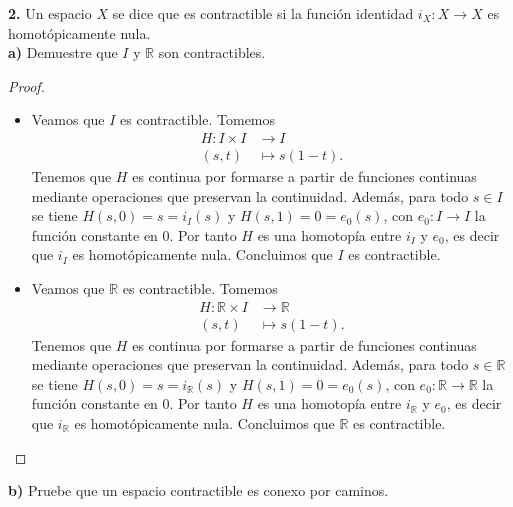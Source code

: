 \textbf{2.} Un espacio $X$ se dice que es contractible si la función identidad $i_X:X\to X$ es homotópicamente nula.\\
\textbf{a)} Demuestre que $I$ y $\mathbb{R}$ son contractibles.
\begin{proof}
   \phantom{o}
   \begin{itemize}
      \item Veamos que $I$ es contractible. Tomemos
         \[
         \begin{aligned}
         H \colon I \times I &\longrightarrow I \\
         (s,t) &\longmapsto s(1-t).
         \end{aligned}
         \]
         Tenemos que $H$ es continua por formarse a partir de funciones continuas mediante operaciones que preservan la continuidad. Además, para todo $s\in I$ se tiene $H(s,0)=s=i_I(s)$ y $H(s,1)=0=e_0(s)$, con $e_0:I\to I$ la función constante en $0$. Por tanto $H$ es una homotopía entre $i_I$ y $e_0$, es decir que $i_I$ es homotópicamente nula. Concluimos que $I$ es contractible.
      \item Veamos que $\mathbb{R}$ es contractible. Tomemos
         \[
         \begin{aligned}
         H \colon \mathbb{R} \times I &\longrightarrow \mathbb{R} \\
         (s,t) &\longmapsto s(1-t).
         \end{aligned}
         \]
         Tenemos que $H$ es continua por formarse a partir de funciones continuas mediante operaciones que preservan la continuidad. Además, para todo $s\in \mathbb{R}$ se tiene $H(s,0)=s=i_\mathbb{R}(s)$ y $H(s,1)=0=e_0(s)$, con $e_0:\mathbb{R}\to \mathbb{R}$ la función constante en $0$. Por tanto $H$ es una homotopía entre $i_\mathbb{R}$ y $e_0$, es decir que $i_\mathbb{R}$ es homotópicamente nula. Concluimos que $\mathbb{R}$ es contractible.
   \end{itemize}
\end{proof}
\textbf{b)} Pruebe que un espacio contractible es conexo por caminos.
